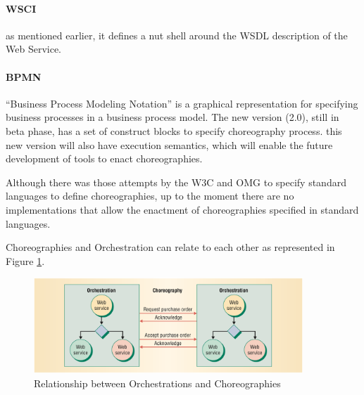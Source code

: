 \paragraph{WSCI}
as mentioned earlier, it defines a nut shell around the WSDL description of the Web Service.

\paragraph{BPMN}
``Business Process Modeling Notation'' is a graphical representation for specifying business processes in a business process model. The new version (2.0), still in beta phase, has a set of construct blocks to specify choreography process. this new version will also have execution semantics, which will enable the future development of tools to enact choreographies.

Although there was those attempts by the W3C and OMG to specify standard languages to define choreographies, up to the moment there are no implementations that allow the enactment of choreographies specified in standard languages.

Choreographies and Orchestration can relate to each other as represented in Figure \ref{relation-orchestrationXchoreography}.


\begin{figure}[htb]
	\centering
	\includegraphics[width=0.9\textwidth]{images/relation-orchestrationXchoreography}
	\caption{Relationship between Orchestrations and Choreographies}
	\label{relation-orchestrationXchoreography}
\end{figure}




